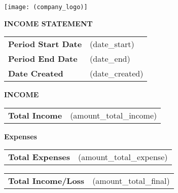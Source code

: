 \documentclass[english]{article}
\providecommand{\tabularnewline}{\\}
\begin{document}
\noindent \texttt{[image: (company\_logo)]}

\noindent \vspace{10mm}

\noindent \textbf{INCOME STATEMENT}

\noindent \vspace{10mm}


\noindent \begin{tabular}{ll}
\textbf{Period Start Date} & (date\_start) \tabularnewline
\textbf{Period End Date} & (date\_end) \tabularnewline
\textbf{Date Created} & (date\_created) \tabularnewline
\end{tabular}

\noindent \vspace{10mm}

\noindent \textbf{INCOME}

\noindent \begin{tabular}{>{\raggedright}p{}>{\raggedright}p{}}
\cline{2-2} 
\textbf{Total Income} & (amount\_total\_income)\tabularnewline
\end{tabular}

\noindent \vspace{5mm}


\noindent \textbf{Expenses}

\noindent \begin{tabular}{>{\raggedright}p{}>{\raggedright}p{}}
\cline{2-2} 
\textbf{Total Expenses} & (amount\_total\_expense)\tabularnewline
\end{tabular}

\noindent \vspace{5mm}


\noindent \begin{tabular}{>{\raggedright}p{}>{\raggedright}p{}}
\textbf{Total Income/Loss} & (amount\_total\_final)\tabularnewline
\end{tabular}
\end{document}
